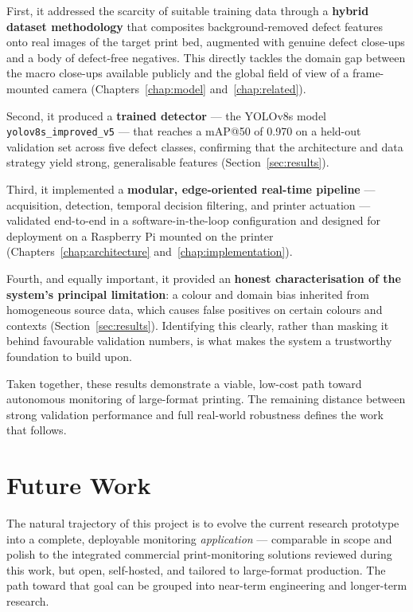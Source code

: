 \documentclass[english, Lau, oneside]{sapthesis}
\begin{document}
First, it addressed the scarcity of suitable training data through a \textbf{hybrid dataset methodology} that composites background-removed defect features onto real images of the target print bed, augmented with genuine defect close-ups and a body of defect-free negatives. This directly tackles the domain gap between the macro close-ups available publicly and the global field of view of a frame-mounted camera (Chapters~\ref{chap:model} and~\ref{chap:related}).

Second, it produced a \textbf{trained detector} --- the YOLOv8s model \texttt{yolov8s\_improved\_v5} --- that reaches a mAP@50 of 0.970 on a held-out validation set across five defect classes, confirming that the architecture and data strategy yield strong, generalisable features (Section~\ref{sec:results}).

Third, it implemented a \textbf{modular, edge-oriented real-time pipeline} --- acquisition, detection, temporal decision filtering, and printer actuation --- validated end-to-end in a software-in-the-loop configuration and designed for deployment on a Raspberry Pi mounted on the printer (Chapters~\ref{chap:architecture} and~\ref{chap:implementation}).

Fourth, and equally important, it provided an \textbf{honest characterisation of the system's principal limitation}: a colour and domain bias inherited from homogeneous source data, which causes false positives on certain colours and contexts (Section~\ref{sec:results}). Identifying this clearly, rather than masking it behind favourable validation numbers, is what makes the system a trustworthy foundation to build upon.

Taken together, these results demonstrate a viable, low-cost path toward autonomous monitoring of large-format printing. The remaining distance between strong validation performance and full real-world robustness defines the work that follows.

\section{Future Work}
The natural trajectory of this project is to evolve the current research prototype into a complete, deployable monitoring \textit{application} --- comparable in scope and polish to the integrated commercial print-monitoring solutions reviewed during this work, but open, self-hosted, and tailored to large-format production. The path toward that goal can be grouped into near-term engineering and longer-term research.
\end{document}
